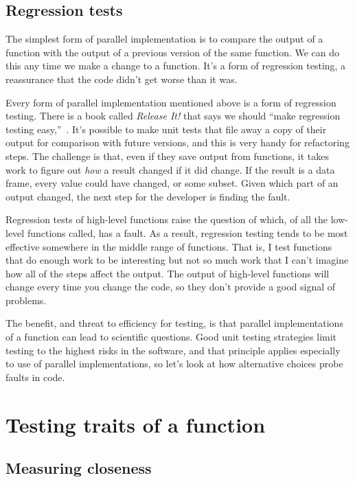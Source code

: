 \documentclass[fleqn,10pt]{olplainarticle}
\begin{document}
\subsection{Regression tests}
The simplest form of parallel implementation is to compare the output
of a function with the output of a previous version of the same
function. We can do this any time we make a change to a function.
It's a form of regression testing, a reassurance that the code
didn't get worse than it was.

Every form of parallel implementation mentioned above is a form
of regression testing.
There is a book called \emph{Release It!} that says we should
``make regression testing easy,''~\citep{nygard2018release}.
It's possible to make unit tests that file away a copy of
their output for comparison with future versions, and this is
very handy for refactoring steps.
The challenge is that, even if
they save output from functions, it takes work to figure out
\emph{how} a result changed if it did change. If the result
is a data frame, every value could have changed, or some subset.
Given which part of an output changed, the next step for the
developer is finding the fault.

Regression tests of high-level functions raise the question
of which, of all the low-level functions called, has a fault.
As a result, regression testing tends to be most effective
somewhere in the middle range of functions. That is, I test
functions that do enough work to be interesting but not so much
work that I can't imagine how all of the steps affect the output.
The output of high-level functions will change every time you
change the code, so they don't provide a good signal of problems.

The benefit, and threat to efficiency for testing, is that
parallel implementations of a function can lead to scientific
questions. Good unit testing strategies limit testing to the
highest risks in the software, and that principle applies
especially to use of parallel implementations, so let's
look at how alternative choices probe faults in code.



\section{Testing traits of a function}

\subsection{Measuring closeness}
\end{document}
